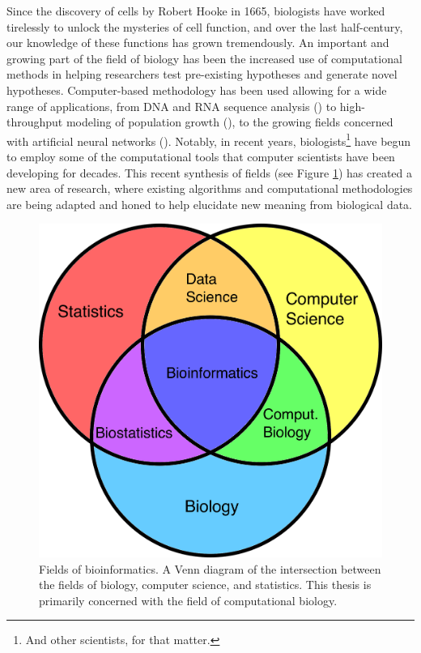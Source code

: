 \documentclass[12pt,twoside]{reedthesis}
\theoremstyle{definition}
\begin{document}
\onehalfspacing

Since the discovery of cells by Robert Hooke in 1665, biologists have worked tirelessly to unlock the mysteries of cell function, and over the last half-century, our knowledge of these functions has grown tremendously. An important and growing part of the field of biology has been the increased use of computational methods in helping researchers test pre-existing hypotheses and generate novel hypotheses. Computer-based methodology has been used allowing for a wide range of applications, from DNA and RNA sequence analysis (\cite{humanGenome}) to high-throughput modeling of population growth (\cite{Anderson2005}), to the growing fields concerned with artificial neural networks (\cite{Chon1996}). Notably, in recent years, biologists\footnote{And other scientists, for that matter.} have begun to employ some of the computational tools that computer scientists have been developing for decades. This recent synthesis of fields (see Figure \ref{fig:bioinf_venn}) has created a new area of research, where existing algorithms and computational methodologies are being adapted and honed to help elucidate new meaning from biological data.\par

 \begin{figure}[!h]
   \begin{center}
     \includegraphics[width=\textwidth/2]{bioinfo_venn}
   \caption[Fields of bioinformatics.]{Fields of bioinformatics. A Venn diagram of the intersection between the fields of biology, computer science, and statistics. This thesis is primarily concerned with the field of computational biology.}
   \label{fig:bioinf_venn}
   \end{center}
 \end{figure}
\end{document}
